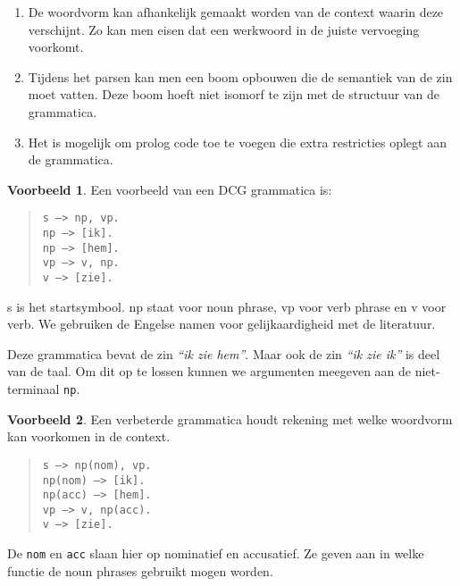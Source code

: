 \documentclass[]{article}
\theoremstyle{definition}
\newtheorem{ex}{Voorbeeld}[section]
\newcommand{\example}[1]{\textit{``#1''}}
\begin{document}
\begin{enumerate}
  \item De woordvorm kan afhankelijk gemaakt worden van de context waarin deze verschijnt. Zo kan men eisen dat een werkwoord in de juiste vervoeging voorkomt.
  \item Tijdens het parsen kan men een boom opbouwen die de semantiek van de zin moet vatten. Deze boom hoeft niet isomorf te zijn met de structuur van de grammatica.
  \item Het is mogelijk om prolog code toe te voegen die extra restricties oplegt aan de grammatica.
\end{enumerate}

\begin{ex}
  Een voorbeeld van een DCG grammatica is:
  \begin{quote}
    \texttt{s ---> np, vp.} \\
    \texttt{np ---> [ik].} \\
    \texttt{np ---> [hem].} \\
    \texttt{vp ---> v, np.} \\
    \texttt{v ---> [zie].}
  \end{quote}
  s is het startsymbool. np staat voor noun phrase, vp voor verb phrase en v voor verb. We gebruiken de Engelse namen voor gelijkaardigheid met de literatuur.
\end{ex} 

Deze grammatica bevat de zin \example{ik zie hem}. Maar ook de zin \example{ik zie ik} is deel van de taal. Om dit op te lossen kunnen we argumenten meegeven aan de niet-terminaal \texttt{np}.

\begin{ex}
  \label{ex:nom-acc-features}
  Een verbeterde grammatica houdt rekening met welke woordvorm kan voorkomen in de context.
  \begin{quote}
    \texttt{s ---> np(nom), vp.} \\
    \texttt{np(nom) ---> [ik].} \\
    \texttt{np(acc) ---> [hem].} \\
    \texttt{vp ---> v, np(acc).} \\
    \texttt{v ---> [zie].} \\
  \end{quote}
\end{ex} 

De \texttt{nom} en \texttt{acc} slaan hier op nominatief en accusatief. Ze geven aan in welke functie de noun phrases gebruikt mogen worden.
\end{document}
